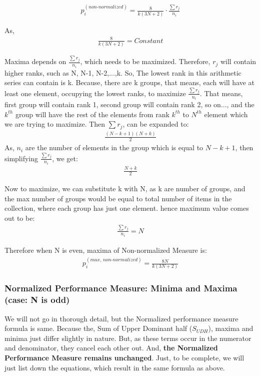 \documentclass[a4paper,fleqn,review]{cas-sc}
\begin{document}
\begin{align*}
	p_i^{(non\text{-}normalized)} = \frac{8}{k(3N + 2)}\cdot \frac{\sum r_j}{n_i}
\end{align*}


As, 
\begin{align*}
	\frac{8}{k(3N + 2)} = Constant
\end{align*}

Maxima depends on $\frac{\sum r_j}{n_i}$, which needs to be maximized. Therefore, $r_j$ will contain higher ranks, such as N, N-1, N-2,...,k. So, The lowest rank in this arithmetic series can contain is k. Because, there are k groups, that means, each will have at least one element, occupying the lowest ranks, to maximize $\frac{\sum r_j}{n_i}$. That means, first group will contain rank 1, second group will contain rank 2, so on..., and the $k^{th}$ group will have the rest of the elements from rank $k^{th}$ to $N^{th}$ element which we are trying to maximize. Then $\sum r_j$, can be expanded to:
\begin{align*}
	\frac{(N-k+1)(N+k)}{2}
\end{align*}
As, $n_i$ are the number of elements in the group which is equal to $N-k+1$, then simplifying $\frac{\sum r_j}{n_i}$, we get:
\begin{align*}
	\frac{N+k}{2}
\end{align*}

Now to maximize, we can substitute k with N, as k are number of groups, and the max number of groups would be equal to total number of items in the collection, where each group has just one element.
hence maximum value comes out to be:
\begin{align*}
	\frac{\sum r_j}{n_i} = N
\end{align*}

Therefore when N is even, maxima of Non-normalized Measure is:
\begin{align*}
	p_i^{(max, \, non\text{-}normalized)} = \frac{8N}{k(3N + 2)}
\end{align*}
\subsubsection{Normalized Performance Measure: Minima and Maxima (case: N is odd)}
We will not go in thorough detail, but the Normalized performance measure formula is same. Because the, Sum of Upper Dominant half ($S_{UDH}$), maxima and minima just differ slightly in nature. But, as these terms occur in the numerator and denominator, they cancel each other out. And, \textbf{the Normalized Performance Measure remains unchanged}. Just, to be complete, we will just list down the equations, which result in the same formula as above.
\end{document}
